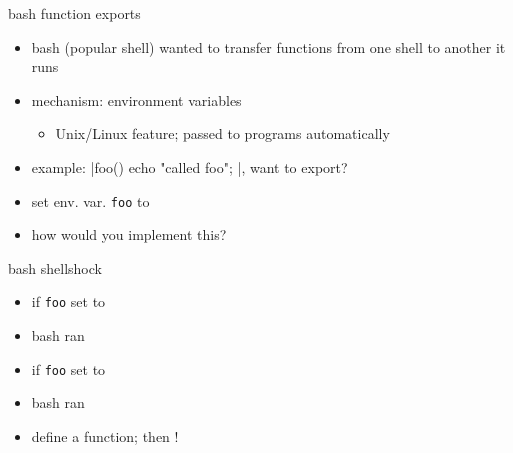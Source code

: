 \begin{frame}[fragile,label=shellShock2]{bash function exports}
\begin{itemize}
    \item bash (popular shell) wanted to transfer functions from one shell to another it runs
    \item mechanism: environment variables 
        \begin{itemize}
            \item Unix/Linux feature; passed to programs automatically
        \end{itemize}
    \item example: \Shellinline|foo() { echo "called foo"; }|, want to export?
    \item set env. var. \texttt{foo} to 
    \vspace{.5cm}
    \item how would you implement this?
\end{itemize}
\end{frame}

\begin{frame}[fragile,label=shellShock3]{bash shellshock}
    \begin{itemize}
        \item if \texttt{foo} set to 
        \item bash ran \\
    \item<2-> if \texttt{foo} set to 
    \item<2-> bash ran 
    \item<2-> define a function; then !
    \end{itemize}
\end{frame}

